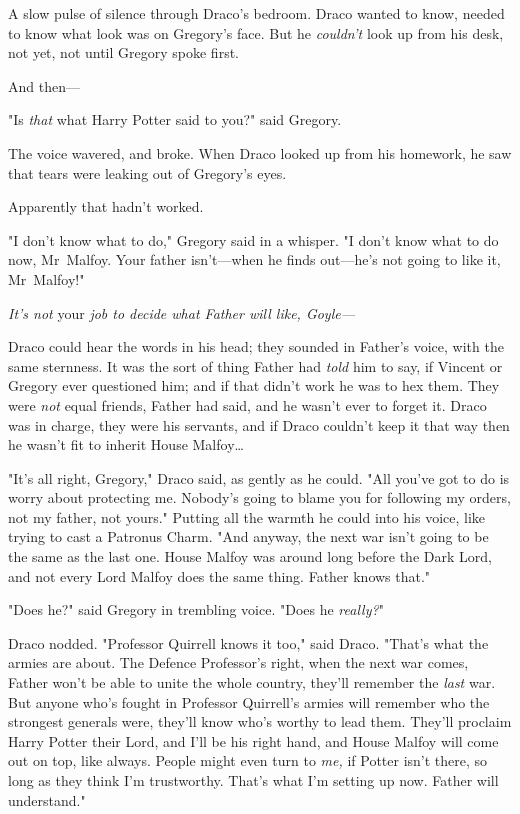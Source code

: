 A slow pulse of silence through Draco's bedroom. Draco wanted to know, needed
to know what look was on Gregory's face. But he \emph{couldn't} look up from
his desk, not yet, not until Gregory spoke first.

And then---

"Is \emph{that} what Harry Potter said to you?" said Gregory.

The voice wavered, and broke. When Draco looked up from his homework, he saw
that tears were leaking out of Gregory's eyes.

Apparently that hadn't worked.

"I don't know what to do," Gregory said in a whisper. "I don't know what to do
now, Mr~Malfoy. Your father isn't---when he finds out---he's not going to like
it, Mr~Malfoy!"

\emph{It's not} your \emph{job to decide what Father will like, Goyle---}

Draco could hear the words in his head; they sounded in Father's voice, with
the same sternness. It was the sort of thing Father had \emph{told} him to say,
if Vincent or Gregory ever questioned him; and if that didn't work he was to
hex them. They were \emph{not} equal friends, Father had said, and he wasn't
ever to forget it. Draco was in charge, they were his servants, and if Draco
couldn't keep it that way then he wasn't fit to inherit House Malfoy{\ldots}

"It's all right, Gregory," Draco said, as gently as he could. "All you've got
to do is worry about protecting me. Nobody's going to blame you for following
my orders, not my father, not yours." Putting all the warmth he could into his
voice, like trying to cast a Patronus Charm. "And anyway, the next war isn't
going to be the same as the last one. House Malfoy was around long before the
Dark Lord, and not every Lord Malfoy does the same thing. Father knows that."

"Does he?" said Gregory in trembling voice. "Does he \emph{really?}"

Draco nodded. "Professor Quirrell knows it too," said Draco. "That's what the
armies are about. The Defence Professor's right, when the next war comes,
Father won't be able to unite the whole country, they'll remember the
\emph{last} war. But anyone who's fought in Professor Quirrell's armies will
remember who the strongest generals were, they'll know who's worthy to lead
them. They'll proclaim Harry Potter their Lord, and I'll be his right hand, and
House Malfoy will come out on top, like always. People might even turn to
\emph{me,} if Potter isn't there, so long as they think I'm trustworthy. That's
what I'm setting up now. Father will understand."

